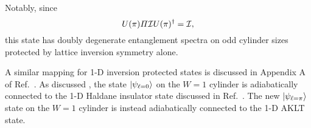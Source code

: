 Notably,
since
$$
U(\pi) \varPi \mathcal{I} U(\pi)^{\dagger} = \mathcal{I}, 
$$
this state has doubly degenerate entanglement spectra on odd cylinder sizes protected by lattice inversion symmetry alone.

A similar mapping for 1-D inversion protected states is discussed in Appendix A of Ref.~. As discussed , the state $\vert \psi_{\ell=0} \rangle$
on the $W=1$ cylinder is adiabatically connected to the 1-D Haldane insulator state discussed in
Ref.~. The new $\vert \psi_{\ell=\pi} \rangle$ state on the $W=1$ cylinder is instead adiabatically connected to the 1-D AKLT state. 

\label{Appendix:Variants}